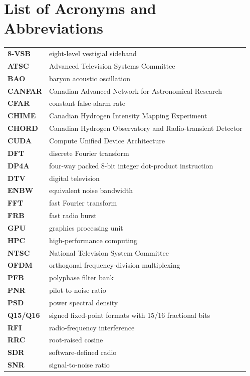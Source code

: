 \documentclass[11pt,oneside]{report}
\begin{document}
\clearpage
\chapter*{List of Acronyms and Abbreviations}
\begin{longtable}{>{\bfseries}p{}p{}}
8-VSB & eight-level vestigial sideband\\
ATSC & Advanced Television Systems Committee\\
BAO & baryon acoustic oscillation\\
CANFAR & Canadian Advanced Network for Astronomical Research\\
CFAR & constant false-alarm rate\\
CHIME & Canadian Hydrogen Intensity Mapping Experiment\\
CHORD & Canadian Hydrogen Observatory and Radio-transient Detector\\
CUDA & Compute Unified Device Architecture\\
DFT & discrete Fourier transform\\
DP4A & four-way packed 8-bit integer dot-product instruction\\
DTV & digital television\\
ENBW & equivalent noise bandwidth\\
FFT & fast Fourier transform\\
FRB & fast radio burst\\
GPU & graphics processing unit\\
HPC & high-performance computing\\
NTSC & National Television System Committee\\
OFDM & orthogonal frequency-division multiplexing\\
PFB & polyphase filter bank\\
PNR & pilot-to-noise ratio\\
PSD & power spectral density\\
Q15/Q16 & signed fixed-point formats with 15/16 fractional bits\\
RFI & radio-frequency interference\\
RRC & root-raised cosine\\
SDR & software-defined radio\\
SNR & signal-to-noise ratio\\
\end{longtable}

\clearpage
{}
\setcounter{page}{1}











\end{document}
